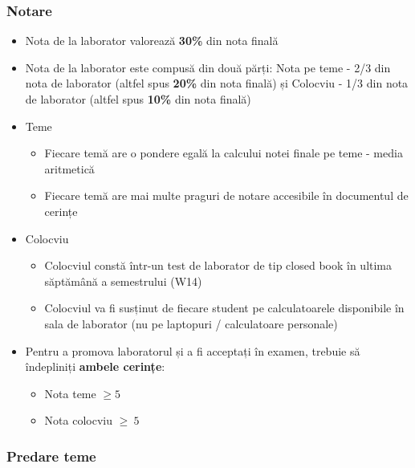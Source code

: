 \documentclass[../en-fa-lab.tex]{subfiles}
\begin{document}
\subsubsection{Notare}\label{notare}

\begin{itemize}
\item
  Nota de la laborator valorează \textbf{30\%} din nota finală
\item 
    Nota de la laborator este compusă din două părți: Nota pe teme - 2/3 din nota de laborator (altfel spus \textbf{20\%} din nota finală) și Colocviu - 1/3 din nota de laborator (altfel spus \textbf{10\%} din nota finală)
\item Teme
\begin{itemize}
    \item
        Fiecare temă are o pondere egală la calcului notei finale pe teme - media aritmetică
    \item
        Fiecare temă are mai multe praguri de notare accesibile în documentul de cerințe
\end{itemize}

\item Colocviu
\begin{itemize}
    \item 
        Colocviul constă într-un test de laborator de tip closed book în ultima săptămână a semestrului (W14)
    \item 
        Colocviul va fi susținut de fiecare student pe calculatoarele disponibile în sala de laborator (nu pe laptopuri / calculatoare personale)
\end{itemize}
\item Pentru a promova laboratorul și a fi acceptați în examen, trebuie să îndepliniți \textbf{ambele cerințe}:
\begin{itemize}
    \item Nota teme $\geq 5$
    \item Nota colocviu $\geq\ 5$
\end{itemize}

\end{itemize}


\subsubsection{Predare teme}\label{predare}
\end{document}
